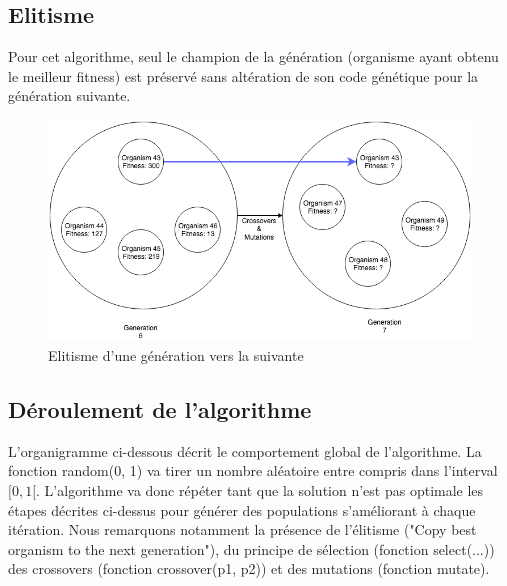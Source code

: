 \documentclass{article}
\begin{document}
\subsection{Elitisme}

Pour cet algorithme, seul le champion de la génération (organisme ayant obtenu le meilleur fitness) est préservé sans altération de son code génétique pour la génération suivante.

\begin{figure}[H]
\begin{center}
	\includegraphics[scale=0.5]{elitism.png}
	\caption{Elitisme d'une génération vers la suivante}
\end{center}
\end{figure}

\subsection{Déroulement de l'algorithme}

L'organigramme ci-dessous décrit le comportement global de l'algorithme. La fonction random(0, 1) va tirer un nombre aléatoire entre compris dans l'interval $[0, 1[$. L'algorithme va donc répéter tant que la solution n'est pas optimale les étapes décrites ci-dessus pour générer des populations s'améliorant à chaque itération. Nous remarquons notamment la présence de l'élitisme ("Copy best organism to the next generation"), du principe de sélection (fonction select(...)) des crossovers (fonction crossover(p1, p2)) et des mutations (fonction mutate). 
\end{document}
